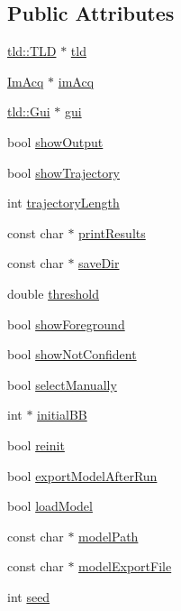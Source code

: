 \subsection*{Public Attributes}
\begin{DoxyCompactItemize}
\item 
\hyperlink{classtld_1_1_t_l_d}{tld::TLD} $\ast$ \hyperlink{class_main_acd79fe4086a18124923606aabb982fec}{tld}
\item 
\hyperlink{struct_im_acq}{ImAcq} $\ast$ \hyperlink{class_main_a37f97b28ea0f64421b5a0bb590059321}{imAcq}
\item 
\hyperlink{classtld_1_1_gui}{tld::Gui} $\ast$ \hyperlink{class_main_a56afdbd63fd6e0f92ed2113ad53cc8df}{gui}
\item 
bool \hyperlink{class_main_ae687ebbff0ebf899894316a3db89fdb5}{showOutput}
\item 
bool \hyperlink{class_main_a1e3ed8eee4f7fe8633419512caa544c2}{showTrajectory}
\item 
int \hyperlink{class_main_a9d46f95b41276d2beeb9b98db1267e98}{trajectoryLength}
\item 
const char $\ast$ \hyperlink{class_main_af1797c9bbb3ff136bba623ced62b8454}{printResults}
\item 
const char $\ast$ \hyperlink{class_main_a4bc0c744bd9bb33aa9bbc92666819330}{saveDir}
\item 
double \hyperlink{class_main_a635e9bb74aaa1960aafcd75d21a8784f}{threshold}
\item 
bool \hyperlink{class_main_a9d083ec93a40eae468d5133fa7dc28ac}{showForeground}
\item 
bool \hyperlink{class_main_abeddae348e1825fbbe33d41457954aeb}{showNotConfident}
\item 
bool \hyperlink{class_main_a4fbe69e8eb79528ea332fb35bd4e2575}{selectManually}
\item 
int $\ast$ \hyperlink{class_main_a0f8b49ea51db0779192fb254c5e31e22}{initialBB}
\item 
bool \hyperlink{class_main_aedcd2167cc4b32d974742b745e51c8fb}{reinit}
\item 
bool \hyperlink{class_main_a9a760d7b7e2dc8dc9bdaa027a86da734}{exportModelAfterRun}
\item 
bool \hyperlink{class_main_ad0301eff91ba4a68e41e28f238f5a743}{loadModel}
\item 
const char $\ast$ \hyperlink{class_main_a47ef2693d73c1e51a329a50040e20892}{modelPath}
\item 
const char $\ast$ \hyperlink{class_main_a3003ab9835173ebf15939e4b97143615}{modelExportFile}
\item 
int \hyperlink{class_main_a886ff721bab62f931d37b4a0a7ce4b2d}{seed}
\end{DoxyCompactItemize}


